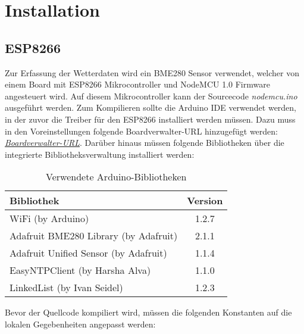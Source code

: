 

\section{Installation}\label{Installation}

\subsection{ESP8266}\label{ESP}
Zur Erfassung der Wetterdaten wird ein BME280 Sensor verwendet, welcher von einem Board mit ESP8266 Mikrocontroller und NodeMCU 1.0 Firmware angesteuert wird. Auf diesem Mikrocontroller kann der Sourcecode \textit{nodemcu.ino} ausgeführt werden. Zum Kompilieren sollte die Arduino IDE verwendet werden, in der zuvor die Treiber für den ESP8266 installiert werden müssen. Dazu muss in den Voreinstellungen folgende Boardverwalter-URL hinzugefügt werden: \textit{\href{http://arduino.esp8266.com/stable/package\_esp8266com\_index.json}{Boardverwalter-URL}}. Darüber hinaus müssen folgende Bibliotheken über die integrierte Bibliotheksverwaltung installiert werden:

\begin{table}[hbt]
    \centering
    \begin{minipage}[t]{.5\textwidth}
        \caption{Verwendete Arduino-Bibliotheken}
        \begin{tabular}{|l|c|}
            \hline
            \textbf{Bibliothek}                       & \textbf{Version} \\
            \hline
            WiFi (by Arduino)                     & 1.2.7            \\
            \hline
            Adafruit BME280 Library (by Adafruit) & 2.1.1            \\
            \hline
            Adafruit Unified Sensor (by Adafruit) & 1.1.4            \\
            \hline
            EasyNTPClient (by Harsha Alva)        & 1.1.0            \\
            \hline
            LinkedList (by Ivan Seidel)           & 1.2.3            \\
			\hline
		\end{tabular}
\label{tab:usedArduinoLibs}
\end{minipage}
\end{table}

Bevor der Quellcode kompiliert wird, müssen die folgenden Konstanten auf die lokalen Gegebenheiten angepasst werden:

